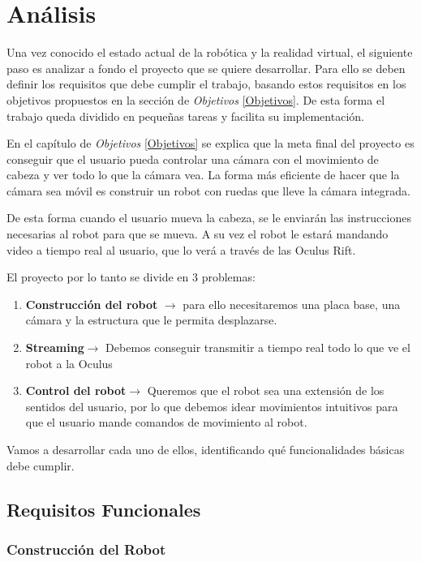 \documentclass[twoside, 11pt]{epstfg}
\begin{document}
\chapter{Análisis}
\label{chap:sistemadesarrollado}
Una vez conocido el estado actual de la robótica y la realidad virtual, el siguiente paso es analizar a fondo el proyecto que se quiere desarrollar.
Para ello se deben definir los requisitos que debe cumplir el trabajo, basando estos requisitos en los objetivos propuestos en la sección de \textit{Objetivos} \ref{Objetivos}. De esta forma el trabajo queda dividido en pequeñas tareas y facilita su implementación.

En el capítulo de \textit{Objetivos} \ref{Objetivos} se explica que la meta final del proyecto es conseguir que el usuario pueda controlar una cámara con el movimiento de cabeza y ver todo lo que la cámara vea.
La forma más eficiente de hacer que la cámara sea móvil es construir un robot con ruedas que lleve la cámara integrada. 

De esta forma cuando el usuario mueva la cabeza, se le enviarán las instrucciones necesarias al robot para que se mueva. A su vez el robot le estará mandando video a tiempo real al usuario, que lo verá a través de las Oculus Rift.


El proyecto por lo tanto se divide en 3 problemas:
\begin{enumerate}
	\item \textbf{Construcción del robot} $\rightarrow$ para ello necesitaremos una placa base, una cámara y la estructura que le permita desplazarse.
	\item \textbf{Streaming}$\rightarrow$ Debemos conseguir transmitir a tiempo real todo lo que ve el robot a la Oculus
	\item \textbf{Control del robot}$\rightarrow$ Queremos que el robot sea una extensión de los sentidos del usuario, por lo que debemos idear movimientos intuitivos para que el usuario mande comandos de movimiento al robot.
\end{enumerate}

Vamos a desarrollar cada uno de ellos, identificando qué funcionalidades básicas debe cumplir.

\section{Requisitos Funcionales}

\subsection{Construcción del Robot}
\end{document}
